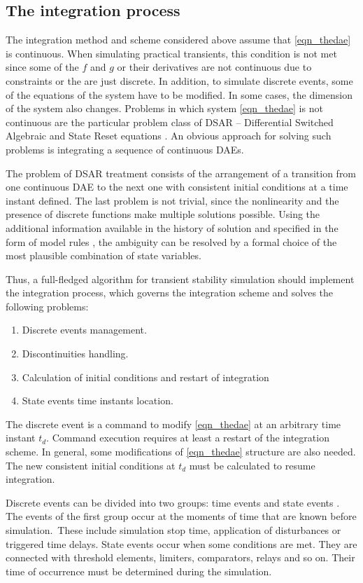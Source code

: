 \documentclass[lettersize,journal]{IEEEtran}
\begin{document}
\subsection {The integration process}
The integration method and scheme considered above assume that \eqref{eqn_thedae} is continuous. When simulating practical transients, this condition is not met since some of the \(f\) and \(g\) or their derivatives are not continuous due to constraints or the are just discrete. In addition, to simulate discrete events, some of the equations of the system have to be modified. In some cases, the dimension of the system also changes. Problems in which system \eqref{eqn_thedae} is not continuous are the particular problem class of DSAR -- Differential Switched Algebraic and State Reset equations \cite{Hiskens01}. An obvious approach for solving such problems is integrating a sequence of continuous DAEs.

The problem of DSAR treatment consists of the arrangement of a transition from one continuous DAE to the next one with consistent initial conditions at a time instant defined. The last problem is not trivial, since the nonlinearity and the presence of discrete functions make multiple solutions possible. Using the additional information available in the history of solution and specified in the form of model rules \cite{mycompiler}, the ambiguity can be resolved by a formal choice of the most plausible combination of state variables.

Thus, a full-fledged algorithm for transient stability simulation should implement the integration process, which governs the integration scheme and solves the following problems:
\begin{enumerate}
	\item Discrete events management.
	\item Discontinuities handling.
	\item Calculation of initial conditions and restart of integration
	\item State events time instants location.
\end{enumerate}

The discrete event is a command to modify \eqref{eqn_thedae} at an arbitrary time instant \(t_d\). Command execution requires at least a restart of the integration scheme. In general, some modifications of \eqref{eqn_thedae} structure are also needed. The new consistent initial conditions at \(t_d\) must be calculated to resume integration.

Discrete events can be divided into two groups: time events and state events \cite{cellier06}.  The events of the first group occur at the moments of time that are known before simulation. These include simulation stop time, application of disturbances or triggered time delays. State events occur when some conditions are met. They are connected with threshold elements, limiters, comparators, relays and so on.  Their time of occurrence must be determined during the simulation. 
\end{document}
